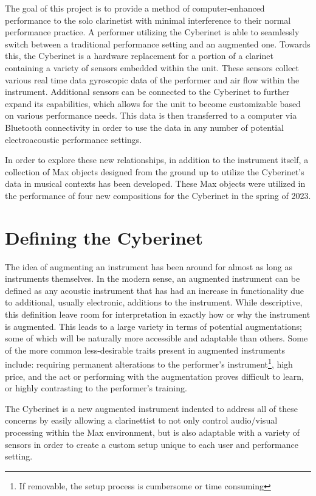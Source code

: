 The goal of this project is to provide a method of computer-enhanced performance to the solo clarinetist with minimal interference to their normal performance practice. A performer utilizing the Cyberinet is able to seamlessly switch between a traditional performance setting and an augmented one. Towards this, the Cyberinet is a hardware replacement for a portion of a clarinet containing a variety of sensors embedded within the unit. These sensors collect various real time data gyroscopic data of the performer and air flow within the instrument. Additional sensors can be connected to the Cyberinet to further expand its capabilities, which allows for the unit to become customizable based on various performance needs. This data is then transferred to a computer via Bluetooth connectivity in order to use the data in any number of potential electroacoustic performance settings. 

In order to explore these new relationships, in addition to the instrument itself, a collection of Max objects designed from the ground up to utilize the Cyberinet’s data in musical contexts has been developed. These Max objects were utilized in the performance of four new compositions for the Cyberinet in the spring of 2023.

\mainmatter
\chapter{Defining the Cyberinet}

The idea of augmenting an instrument has been around for almost as long as instruments themselves. In the modern sense, an augmented instrument can be defined as any acoustic instrument that has had an increase in functionality due to additional, usually electronic, additions to the instrument\cite{miranda_Wanderley_instrumentControl_2006}. While descriptive, this definition leave room for interpretation in exactly how or why the instrument is augmented. This leads to a large variety in terms of potential augmentations; some of which will be naturally more accessible and adaptable than others. Some of the more common less-desirable traits present in augmented instruments include: requiring permanent alterations to the performer's instrument\footnote{If removable, the setup process is cumbersome or time consuming}, high price, and the act or performing with the augmentation proves difficult to learn, or highly contrasting to the performer's training. 

The Cyberinet is a new augmented instrument indented to address all of these concerns by easily allowing a clarinettist to not only control audio/visual processing within the Max environment, but is also adaptable with a variety of sensors in order to create a custom setup unique to each user and performance setting.

